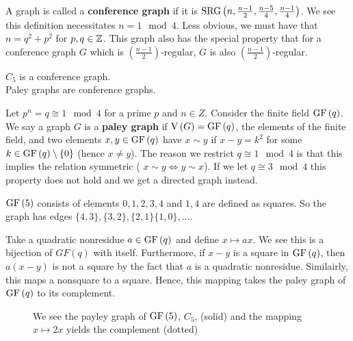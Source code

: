 \begin{definition}
	A graph is called a \textbf{conference graph} if it is \(\operatorname{SRG} \left( n, \frac{n-1}{2}, \frac{n-5}{4}, \frac{n-1}{4} \right) \). We see this definition necessitates \(n=1 \mod 4\). Less obvious, we must have that \(n= q^2 + p^2\) for \(p, q \in \mathbb{Z}\). This graph also has the special property that for a conference graph \(G\) which is \(\left( \frac{n-1}{2} \right) \)-regular, \(\overline{G}\) is also \(\left( \frac{n-1}{2} \right) \)-regular.
\end{definition}
\begin{example}
	\(C_5\) is a conference graph.\\
	Paley graphs are conference graphs.\\
\end{example}
\begin{definition}
	Let \(p^{n} = q \cong 1 \mod 4\) for a prime \(p\) and \(n \in Z\). Consider the finite field \(\operatorname{GF}\left( q \right) \). We say a graph \(G\) is a \textbf{paley graph} if \(\operatorname{V}\left( G \right) = \operatorname{GF}\left( q \right) \), the elements of the finite field, and two elements \(x, y \in \operatorname{GF}\left( q \right) \) have \(x \sim y\) if \(x-y = k^2\)  for some \(k \in \operatorname{GF}\left( q \right) \setminus \{0\}  \) (hence \(x \neq y\)). The reason we restrict \(q \cong 1 \mod 4\) is that this implies the relation symmetric ( \(x \sim y \iff y \sim x\)). If we let \(q \cong 3 \mod 4\) this property does not hold and we get a directed graph instead.
\end{definition}
\begin{example}
	\(\operatorname{GF}\left( 5 \right) \) consists of elements \(0, 1, 2, 3, 4\) and  \(1, 4\) are defined as squares. So the graph has edges \(\{4, 3\} ,  \{3, 2\} , \{2, 1\} \{1, 0\} , \ldots\). \\
\end{example}
\begin{remark}
	Take a quadratic nonresidue \(a \in \operatorname{GF}\left( q \right) \) and define \(x \mapsto ax\). We see this is a bijection of \(GF\left( q \right) \) with itself. Furthermore, if \(x-y\) is a square in \(\operatorname{GF}\left( q \right) \), then \(a\left( x-y \right) \) is not a square by the fact that \(a\) is a quadratic nonresidue. Similairly, this maps a nonsquare to a square. Hence, this mapping takes the paley graph of \(\operatorname{GF}\left( q \right) \) to its complement.
\end{remark}
\begin{figure}[ht]
    \centering
    \caption{We see the payley graph of \(\operatorname{GF}\left( 5 \right) \), \(C_5\),  (solid) and the mapping \(x \mapsto 2x\) yields the complement (dotted)}
    \label{fig:payleycomp}
\end{figure}
